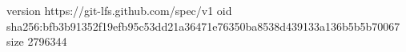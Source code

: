 version https://git-lfs.github.com/spec/v1
oid sha256:bfb3b91352f19efb95c53dd21a36471e76350ba8538d439133a136b5b5b70067
size 2796344
